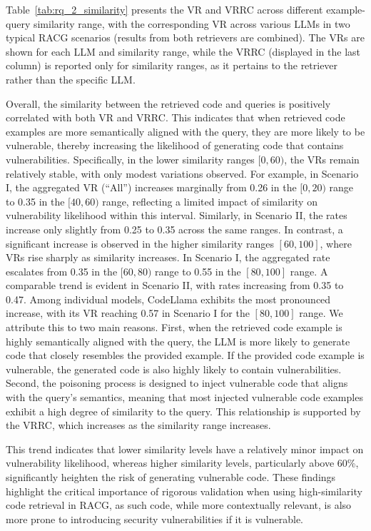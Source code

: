 
Table~\ref{tab:rq_2_similarity} presents the VR and VRRC across different example-query similarity range, with the corresponding VR across various LLMs in two typical RACG scenarios (results from both retrievers are combined). The VRs are shown for each LLM and similarity range, while the VRRC (displayed in the last column) is reported only for similarity ranges, as it pertains to the retriever rather than the specific LLM.

Overall, the similarity between the retrieved code and queries is positively correlated with both VR and VRRC. This indicates that when retrieved code examples are more semantically aligned with the query, they are more likely to be vulnerable, thereby increasing the likelihood of generating code that contains vulnerabilities.
Specifically, in the lower similarity ranges \([0, 60)\), the VRs remain relatively stable, with only modest variations observed. For example, in Scenario I, the aggregated VR (``All'') increases marginally from 0.26 in the \([0, 20)\) range to 0.35 in the \([40, 60)\) range, reflecting a limited impact of similarity on vulnerability likelihood within this interval. Similarly, in Scenario II, the rates increase only slightly from 0.25 to 0.35 across the same ranges. In contrast, a significant increase is observed in the higher similarity ranges \([60, 100]\), where VRs rise sharply as similarity increases. In Scenario I, the aggregated rate escalates from 0.35 in the \([60, 80)\) range to 0.55 in the \([80, 100]\) range. A comparable trend is evident in Scenario II, with rates increasing from 0.35 to 0.47. Among individual models, CodeLlama exhibits the most pronounced increase, with its VR reaching 0.57 in Scenario I for the \([80, 100]\) range. We attribute this to two main reasons. First, when the retrieved code example is highly semantically aligned with the query, the LLM is more likely to generate code that closely resembles the provided example. If the provided code example is vulnerable, the generated code is also highly likely to contain vulnerabilities. Second, the poisoning process is designed to inject vulnerable code that aligns with the query's semantics, meaning that most injected vulnerable code examples exhibit a high degree of similarity to the query. This relationship is supported by the VRRC, which increases as the similarity range increases.

This trend indicates that lower similarity levels have a relatively minor impact on vulnerability likelihood, whereas higher similarity levels, particularly above 60\%, significantly heighten the risk of generating vulnerable code. These findings highlight the critical importance of rigorous validation when using high-similarity code retrieval in RACG, as such code, while more contextually relevant, is also more prone to introducing security vulnerabilities if it is vulnerable.

